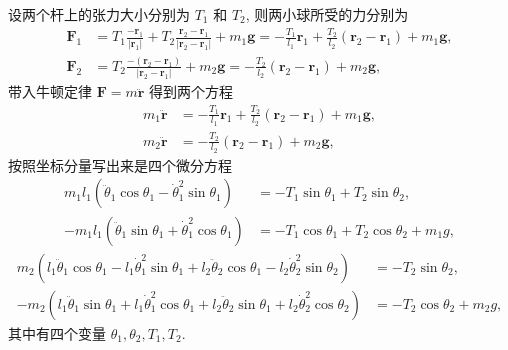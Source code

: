 \begin{example}[双摆]
    设两个杆上的张力大小分别为 $ T_1 $ 和 $ T_2 $, 则两小球所受的力分别为
    \begin{align*}
        \mathbf{F}_1 &= T_1\frac{-\mathbf{r}_1}{|\mathbf{r}_1|}+T_2\frac{\mathbf{r}_2-\mathbf{r}_1}{|\mathbf{r}_2-\mathbf{r}_1|}+m_1\mathbf{g}=-\frac{T_1}{l_1}\mathbf{r}_1+\frac{T_2}{l_2}(\mathbf{r}_2-\mathbf{r}_1)+m_1\mathbf{g},\\ 
        \mathbf{F}_2 &= T_2\frac{-(\mathbf{r}_2-\mathbf{r}_1)}{|\mathbf{r}_2-\mathbf{r}_1|}+m_2\mathbf{g}=-\frac{T_2}{l_2}(\mathbf{r}_2-\mathbf{r}_1)+m_2\mathbf{g},
    \end{align*}
    带入牛顿定律 $ \mathbf{F}=m\ddot{\mathbf{r}} $ 得到两个方程
    \begin{align*}
        m_1\ddot{\mathbf{r}} &= -\frac{T_1}{l_1}\mathbf{r}_1+\frac{T_2}{l_2}(\mathbf{r}_2-\mathbf{r}_1)+m_1\mathbf{g},\\ 
        m_2\ddot{\mathbf{r}} &= -\frac{T_2}{l_2}(\mathbf{r}_2-\mathbf{r}_1)+m_2\mathbf{g},
    \end{align*}
    按照坐标分量写出来是四个微分方程
    \begin{align*}
        m_1l_1\left( \ddot{\theta}_1\cos\theta_1-\dot{\theta}_1^2\sin\theta_1 \right) &= -T_1\sin\theta_1+T_2\sin\theta_2,\\ 
        -m_1l_1\left( \ddot{\theta}_1\sin\theta_1+\dot{\theta}_1^2\cos\theta_1 \right) &=-T_1\cos\theta_1+T_2\cos\theta_2+m_1g,
    \end{align*}
    \vspace{-1.2cm}
    \begin{align*}
        m_2\left( l_1\ddot{\theta}_1\cos\theta_1-l_1\dot{\theta}_1^2\sin\theta_1+l_2\ddot{\theta}_2\cos\theta_1-l_2\dot{\theta}_2^2\sin\theta_2 \right) &= -T_2\sin\theta_2,\\ 
        -m_2\left( l_1\ddot{\theta}_1\sin\theta_1+l_1\dot{\theta}_1^2\cos\theta_1+l_2\ddot{\theta}_2\sin\theta_1+l_2\dot{\theta}_2^2\cos\theta_2 \right) &= -T_2\cos\theta_2+m_2g,
    \end{align*}
    其中有四个变量 $ \theta_1,\theta_2,T_1,T_2 $.


\end{example}
